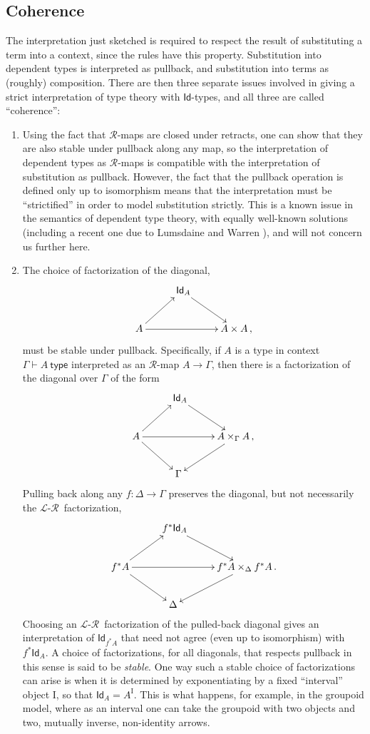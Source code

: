 \documentclass[12pt]{article}
\renewcommand{\L}{\ensuremath{\mathcal{L}}}
\newcommand{\R}{\ensuremath{\mathcal{R}}}
\newcommand{\arr}{\ensuremath{\rightarrow}}
\newcommand{\I}{\ensuremath{\mathrm{I}}}
\newcommand{\G}{\ensuremath{\Gamma}}
\newcommand{\type}{\mathsf{type}}
\newcommand{\types}[2]{#1 \vdash #2\ \type}
\newcommand{\Gtypes}[1]{\types{\Gamma}{#1}}
\newcommand{\Id}{\ensuremath{\mathsf{Id}}}
\newcommand{\id}[1]{\Id_{#1}}
\theoremstyle{remark}
\theoremstyle{definition}
\begin{document}
\subsection{Coherence}

The interpretation just sketched is required to respect the result of substituting a term into a context, since the rules have this property.  Substitution into dependent types is interpreted as pullback, and substitution into terms as (roughly) composition. There are then three separate issues involved in giving a strict interpretation of type theory with \Id-types, and all three are called ``coherence'':

\begin{enumerate}

\item Using the fact that \R-maps are closed under retracts, one can show that they are also stable under pullback along any map, so the interpretation of dependent types as \R-maps is compatible with the interpretation of substitution as pullback.  However, the fact that the pullback operation is defined only up to isomorphism means that the interpretation must be ``strictified'' in order to model substitution strictly.  This is a known issue in the semantics of dependent type theory, with equally well-known solutions (including a recent one due to Lumsdaine and Warren \cite{LW}), and will not concern us further here.

\item The choice of factorization of the diagonal,
\[
\xymatrix{
& \ \id{A} \ar[rd] &\\
A \ar[rr] \ar[ru] && A\times A\,,
}
\]
must be stable under pullback.  Specifically, if $A$ is a type in context $\Gtypes{A}$ interpreted as an \R-map $A\arr\G$, then there is a factorization of the diagonal over $\G$ of the form
\[
\xymatrix{
& \ \id{A} \ar[rd] &\\
A \ar[rr] \ar[ru] \ar[rd] && \ar[ld] A\times_{\G} A\,,\\
& \G &
}
\]
Pulling back along any $f : \Delta \to \G$ preserves the diagonal, but not necessarily the \L-\R\ factorization, 
\[
\xymatrix{
& \ f^*\id{A} \ar[rd] &\\
f^*A \ar[rr] \ar[ru] \ar[rd] && \ar[ld] f^*A\times_{\Delta} f^*A\,.\\
& \Delta &
}
\]
Choosing an \L-\R\ factorization of the pulled-back diagonal gives an interpretation of $\id{f^*A}$ that need not agree (even up to isomorphism) with $f^*\id{A}$.  A choice of factorizations, for all diagonals, that respects pullback in this sense is said to be \emph{stable}.  One way such a stable choice of factorizations can arise is when it is determined by exponentiating by a fixed ``interval'' object $\I$, so that $ \id{A}=A^\I$. This is what happens, for example, in the groupoid model, where as an interval one can take the groupoid with two objects and two, mutually inverse, non-identity arrows.


\end{enumerate}
\end{document}
